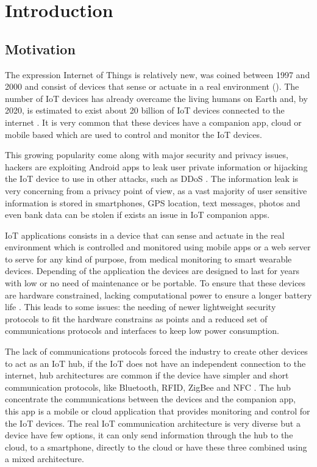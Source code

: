 \chapter{Introduction}

\section{Motivation}

The expression Internet of Things is relatively new, was coined between 1997 and 2000 and consist of devices that sense or actuate in a real environment (\cite{minerva2015towards}). The number of IoT devices has already overcame the living humans on Earth and, by 2020, is estimated to exist about 20 billion of IoT devices connected to the internet \citep{iotmarket}. It is very common that these devices have a companion app, cloud or mobile based which are used to control and monitor the IoT devices.

This growing popularity come along with major security and privacy issues, hackers are exploiting Android apps to leak user private information or hijacking the IoT device to use in other attacks, such as DDoS \citep{ycraig}. The information leak is very concerning from a privacy point of view, as a vast majority of user sensitive information is stored in smartphones, GPS location, text messages, photos and even bank data can be stolen if exists an issue in IoT companion apps.

IoT applications consists in a device that can sense and actuate in the real environment which is controlled and monitored using mobile apps or a web server to serve for any kind of purpose, from medical monitoring to smart wearable devices. Depending of the application the devices are designed to last for years with low or no need of maintenance or be portable. To ensure that these devices are hardware constrained, lacking computational power to ensure a longer battery life \citep{raj2017internet}. This leads to some issues: the needing of newer lightweight security protocols to fit the hardware constrains as \cite{zhang2014iot} points and a reduced set of communications protocols and interfaces to keep low power consumption.

The lack of communications protocols forced the industry to create other devices to act as an IoT hub, if the IoT does not have an independent connection to the internet, hub architectures are common if the device have simpler and short communication protocols, like Bluetooth, RFID, ZigBee and NFC \cite{al2017internet}. The hub concentrate the communications between the devices and the companion app, this app is a mobile or cloud application that provides monitoring and control for the IoT devices. The real IoT communication architecture is very diverse but a device have few options, it can only send information through the hub to the cloud, to a smartphone, directly to the cloud or have these three combined using a mixed architecture.

